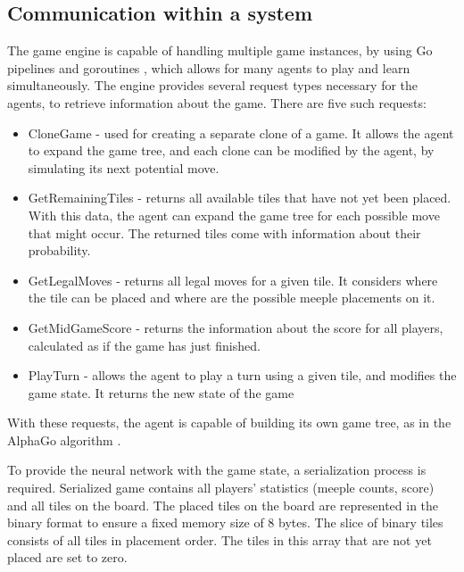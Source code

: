 \subsection{Communication within a system}

The game engine is capable of handling multiple game instances, by using Go pipelines and goroutines \cite{GolangPipeline}, which allows for many agents to play and learn simultaneously. The engine provides several request types necessary for the agents, to retrieve information about the game. There are five such requests:
\begin{itemize}
    \item CloneGame - used for creating a separate clone of a game. It allows the agent to expand the game tree, and each clone can be modified by the agent, by simulating its next potential move.
    \item GetRemainingTiles - returns all available tiles that have not yet been placed. With this data, the agent can expand the game tree for each possible move that might occur. The returned tiles come with information about their probability.
    \item GetLegalMoves - returns all legal moves for a given tile. It considers where the tile can be placed and where are the possible meeple placements on it.
    \item GetMidGameScore - returns the information about the score for all players, calculated as if the game has just finished.
    \item PlayTurn - allows the agent to play a turn using a given tile, and modifies the game state. It returns the new state of the game 
\end{itemize}

With these requests, the agent is capable of building its own game tree, as in the AlphaGo algorithm \cite{AlphaGoAlgorithm}.

To provide the neural network with the game state, a serialization process is required. Serialized game contains all players' statistics (meeple counts, score) and all tiles on the board. The placed tiles on the board are represented in the binary format to ensure a fixed memory size of 8 bytes. The slice of binary tiles consists of all tiles in placement order. The tiles in this array that are not yet placed are set to zero.
